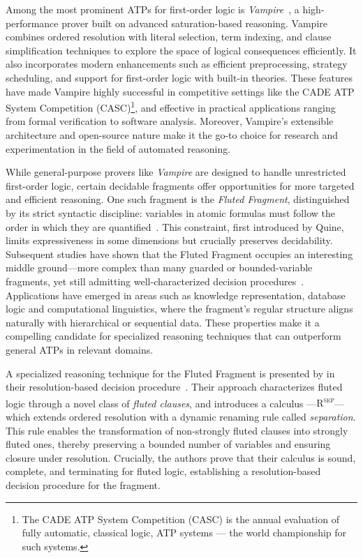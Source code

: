 Among the most prominent ATPs for first-order logic is \emph{Vampire}~\cite{kovacs2013vampire}, a high-performance prover built on advanced saturation-based reasoning.
Vampire combines ordered resolution with literal selection, term indexing, and clause simplification techniques to explore the space of logical consequences efficiently.
It also incorporates modern enhancements such as efficient preprocessing, strategy scheduling, and support for first-order logic with built-in theories.
These features have made Vampire highly successful in competitive settings like the CADE ATP System Competition (CASC)\footnote{The CADE ATP System Competition (CASC) is the annual evaluation of fully automatic, classical logic, ATP systems --- the world championship for such systems.}, and effective in practical applications ranging from formal verification to software analysis.
Moreover, Vampire's extensible architecture and open-source nature make it the go-to choice for research and experimentation in the field of automated reasoning.

While general-purpose provers like \emph{Vampire} are designed to handle unrestricted first-order logic, certain decidable fragments offer opportunities for more targeted and efficient reasoning.
One such fragment is the \emph{Fluted Fragment}, distinguished by its strict syntactic discipline: variables in atomic formulas must follow the order in which they are quantified~\cite{quine1968predicate}.
This constraint, first introduced by Quine, limits expressiveness in some dimensions but crucially preserves decidability. Subsequent studies have shown that the Fluted Fragment occupies an interesting middle ground—more complex than many guarded or bounded-variable fragments, yet still admitting well-characterized decision procedures~\cite{pratt2019fluted}.
Applications have emerged in areas such as knowledge representation, database logic and computational linguistics, where the fragment’s regular structure aligns naturally with hierarchical or sequential data.
These properties make it a compelling candidate for specialized reasoning techniques that can outperform general ATPs in relevant domains.

A specialized reasoning technique for the Fluted Fragment is presented by \citeauthor{schmidt2000resolution} in their resolution-based decision procedure~\cite{schmidt2000resolution}.
Their approach characterizes fluted logic through a novel class of \emph{fluted clauses}, and introduces a calculus ---\textsc{R\textsuperscript{sep}}--- which extends ordered resolution with a dynamic renaming rule called \emph{separation}.
This rule enables the transformation of non-strongly fluted clauses into strongly fluted ones, thereby preserving a bounded number of variables and ensuring closure under resolution.
Crucially, the authors prove that their calculus is sound, complete, and terminating for fluted logic, establishing a resolution-based decision procedure for the fragment.

